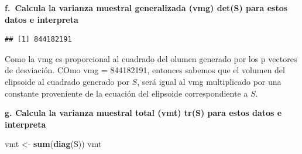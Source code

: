\documentclass[
]{article}
\newenvironment{Shaded}{\begin{snugshade}}{\end{snugshade}}
\newcommand{\CommentTok}[1]{\textcolor[rgb]{0.56,0.35,0.01}{\textit{#1}}}
\newcommand{\DecValTok}[1]{\textcolor[rgb]{0.00,0.00,0.81}{#1}}
\newcommand{\KeywordTok}[1]{\textcolor[rgb]{0.13,0.29,0.53}{\textbf{#1}}}
\newcommand{\NormalTok}[1]{#1}
\newcommand{\OperatorTok}[1]{\textcolor[rgb]{0.81,0.36,0.00}{\textbf{#1}}}
\newcommand{\StringTok}[1]{\textcolor[rgb]{0.31,0.60,0.02}{#1}}
\begin{document}
\textbf{f.~Calcula la varianza muestral generalizada (vmg) det(S) para
estos datos e interpreta}

\begin{Shaded}
\end{Shaded}

\begin{verbatim}
## [1] 844182191
\end{verbatim}

Como la vmg es proporcional al cuadrado del olumen generado por los p
vectores de desviación. COmo vmg = 844182191, entonces sabemos que el
volumen del elipsoide al cuadrado generado por \(S\), será igual al vmg
multiplicado por una constante proveniente de la ecuación del elipsoide
correspondiente a \(S\).

\textbf{g. Calcula la varianza muestral total (vmt) tr(S) para estos
datos e interpreta}

\begin{Shaded}
\begin{Highlighting}[]
\NormalTok{vmt <-}\StringTok{ }\KeywordTok{sum}\NormalTok{(}\KeywordTok{diag}\NormalTok{(S))}
\NormalTok{vmt}
\end{Highlighting}
\end{Shaded}
\end{document}
